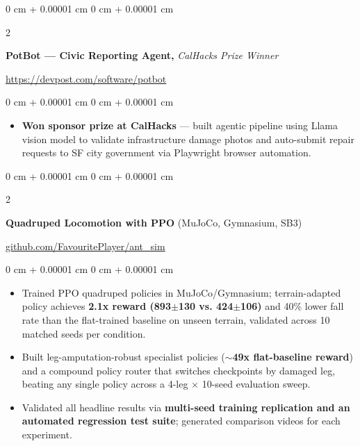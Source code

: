 \documentclass[10pt, letterpaper]{article}
\newenvironment{highlights}{
    \begin{itemize}[
        topsep=0.3 cm,
        parsep=0.06 cm,
        partopsep=0pt,
        itemsep=0.02 cm,
        leftmargin=0 cm + 10pt
    ]
}{
    \end{itemize}
} %
\newenvironment{onecolentry}{
    \begin{adjustwidth}{
        0 cm + 0.00001 cm
    }{
        0 cm + 0.00001 cm
    }
}{
    \end{adjustwidth}
} %
\newenvironment{extendedtwocolentry}[2][]{
    \onecolentry
    \def\secondColumn{#2}
    \setcolumnwidth{\fill, 8 cm}
    \begin{paracol}{2}
}{
    \switchcolumn \raggedleft \secondColumn
    \end{paracol}
    \endonecolentry
}
\begin{document}
        \begin{extendedtwocolentry}{
            \href{https://devpost.com/software/potbot}{https://devpost.com/software/potbot}
        }
            \textbf{PotBot — Civic Reporting Agent,} \textit{CalHacks Prize Winner}
        \end{extendedtwocolentry}

        \vspace{0.075 cm}
        \begin{onecolentry}
            \begin{highlights}
                \item \textbf{Won sponsor prize at CalHacks} — built agentic pipeline using Llama vision model to validate infrastructure damage photos and auto-submit repair requests to SF city government via Playwright browser automation.
            \end{highlights}
        \end{onecolentry}

        \begin{extendedtwocolentry}{
            \href{https://github.com/FavouritePlayer/ant_sim}{github.com/FavouritePlayer/ant\_sim}
        }
            \textbf{Quadruped Locomotion with PPO} (MuJoCo, Gymnasium, SB3)
        \end{extendedtwocolentry}

        \vspace{0.075 cm}
        \begin{onecolentry}
            \begin{highlights}
                \item Trained PPO quadruped policies in MuJoCo/Gymnasium; terrain-adapted policy achieves \textbf{2.1x reward (893$\pm$130 vs. 424$\pm$106)} and 40\% lower fall rate than the flat-trained baseline on unseen terrain, validated across 10 matched seeds per condition.
                \item Built leg-amputation-robust specialist policies (\textbf{$\sim$49x flat-baseline reward}) and a compound policy router that switches checkpoints by damaged leg, beating any single policy across a 4-leg $\times$ 10-seed evaluation sweep.
                \item Validated all headline results via \textbf{multi-seed training replication and an automated regression test suite}; generated comparison videos for each experiment.
            \end{highlights}
        \end{onecolentry}
\end{document}
